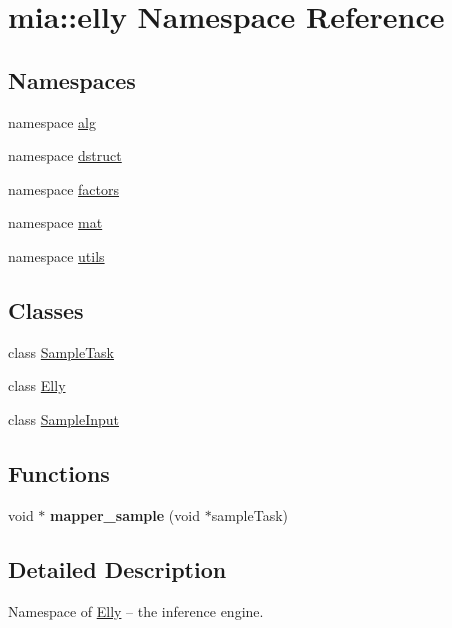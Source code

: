 \hypertarget{namespacemia_1_1elly}{\section{mia\-:\-:elly Namespace Reference}
\label{namespacemia_1_1elly}
}
\subsection*{Namespaces}
\begin{DoxyCompactItemize}
\item 
namespace \hyperlink{namespacemia_1_1elly_1_1alg}{alg}
\item 
namespace \hyperlink{namespacemia_1_1elly_1_1dstruct}{dstruct}
\item 
namespace \hyperlink{namespacemia_1_1elly_1_1factors}{factors}
\item 
namespace \hyperlink{namespacemia_1_1elly_1_1mat}{mat}
\item 
namespace \hyperlink{namespacemia_1_1elly_1_1utils}{utils}
\end{DoxyCompactItemize}
\subsection*{Classes}
\begin{DoxyCompactItemize}
\item 
class \hyperlink{classmia_1_1elly_1_1_sample_task}{Sample\-Task}
\item 
class \hyperlink{classmia_1_1elly_1_1_elly}{Elly}
\item 
class \hyperlink{classmia_1_1elly_1_1_sample_input}{Sample\-Input}
\end{DoxyCompactItemize}
\subsection*{Functions}
\begin{DoxyCompactItemize}
\item 
\hypertarget{namespacemia_1_1elly_a4f35fa786e9e6f482f3881b8c6e66e1a}{void $\ast$ {\bfseries mapper\-\_\-sample} (void $\ast$sample\-Task)}\label{namespacemia_1_1elly_a4f35fa786e9e6f482f3881b8c6e66e1a}

\end{DoxyCompactItemize}


\subsection{Detailed Description}
Namespace of \hyperlink{classmia_1_1elly_1_1_elly}{Elly} -- the inference engine. 